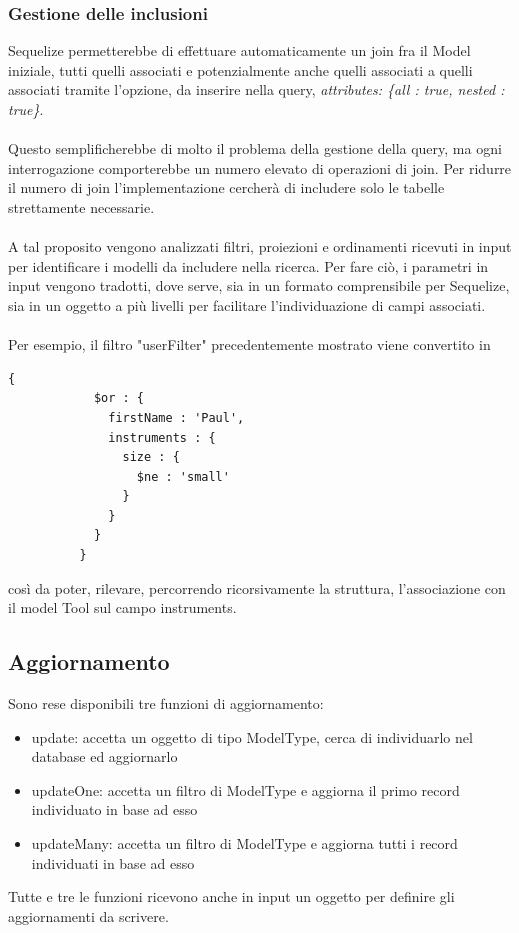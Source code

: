 \documentclass[a4paper, 12pt]{report}
\begin{document}
      \subsubsection*{Gestione delle inclusioni}
        Sequelize permetterebbe di effettuare automaticamente un join fra il Model iniziale, tutti quelli associati e potenzialmente anche quelli associati a quelli associati tramite l'opzione, da inserire nella query,
        \emph{attributes: \{all : true, nested : true\}}.
        \paragraph*{}
        Questo semplificherebbe di molto il problema della gestione della query, ma ogni interrogazione comporterebbe un numero elevato di operazioni di join.
        Per ridurre il numero di join l'implementazione cercherà di includere solo le tabelle strettamente necessarie.
        \paragraph*{}
        A tal proposito vengono analizzati filtri, proiezioni e ordinamenti ricevuti in input per identificare i modelli da includere nella ricerca.
        Per fare ciò, i parametri in input vengono tradotti, dove serve, sia in un formato comprensibile per Sequelize, sia in un oggetto a più livelli per facilitare l'individuazione di campi associati.
        \paragraph*{}
        Per esempio, il filtro "userFilter" precedentemente mostrato viene convertito in
        \begin{Verbatim}[samepage=true]
          {
            $or : {
              firstName : 'Paul',
              instruments : {
                size : {
                  $ne : 'small'
                }
              }
            }
          }
        \end{Verbatim}
        così da poter, rilevare, percorrendo ricorsivamente la struttura, l'associazione con il model Tool sul campo instruments.
    \subsection{Aggiornamento}
      Sono rese disponibili tre funzioni di aggiornamento: 
      \begin{itemize}
        \item update: accetta un oggetto di tipo ModelType, cerca di individuarlo nel database ed aggiornarlo
        \item updateOne: accetta un filtro di ModelType e aggiorna il primo record individuato in base ad esso
        \item updateMany: accetta un filtro di ModelType e aggiorna tutti i record individuati in base ad esso
      \end{itemize} 
      Tutte e tre le funzioni ricevono anche in input un oggetto per definire gli aggiornamenti da scrivere.
\end{document}
